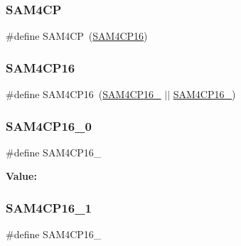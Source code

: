 \subsubsection{\texorpdfstring{SAM4CP}{SAM4CP}}
{\footnotesize\ttfamily \#define S\+A\+M4\+CP~(\mbox{\hyperlink{group__sam__part__macros__group_gafd1c94764b607ffb18e6a495e5486659}{S\+A\+M4\+C\+P16}})}

\mbox{\label{group__sam__part__macros__group_gafd1c94764b607ffb18e6a495e5486659}} 
\subsubsection{\texorpdfstring{SAM4CP16}{SAM4CP16}}
{\footnotesize\ttfamily \#define S\+A\+M4\+C\+P16~(\mbox{\hyperlink{group__sam__part__macros__group_gaa7359e4b343a4ab48894b656b2f349b9}{S\+A\+M4\+C\+P16\+\_}} $\vert$$\vert$ \mbox{\hyperlink{group__sam__part__macros__group_ga6757116bcbffd58eca2b98b620175590}{S\+A\+M4\+C\+P16\+\_}})}

\mbox{\label{group__sam__part__macros__group_gaa7359e4b343a4ab48894b656b2f349b9}} 
\subsubsection{\texorpdfstring{SAM4CP16\_0}{SAM4CP16\_0}}
{\footnotesize\ttfamily \#define S\+A\+M4\+C\+P16\+\_}

{\bfseries Value\+:}
\begin{DoxyCode}{0}
\DoxyCodeLine{( \(\backslash\)}
\DoxyCodeLine{        )}

\end{DoxyCode}
\mbox{\label{group__sam__part__macros__group_ga6757116bcbffd58eca2b98b620175590}} 
\subsubsection{\texorpdfstring{SAM4CP16\_1}{SAM4CP16\_1}}
{\footnotesize\ttfamily \#define S\+A\+M4\+C\+P16\+\_}

